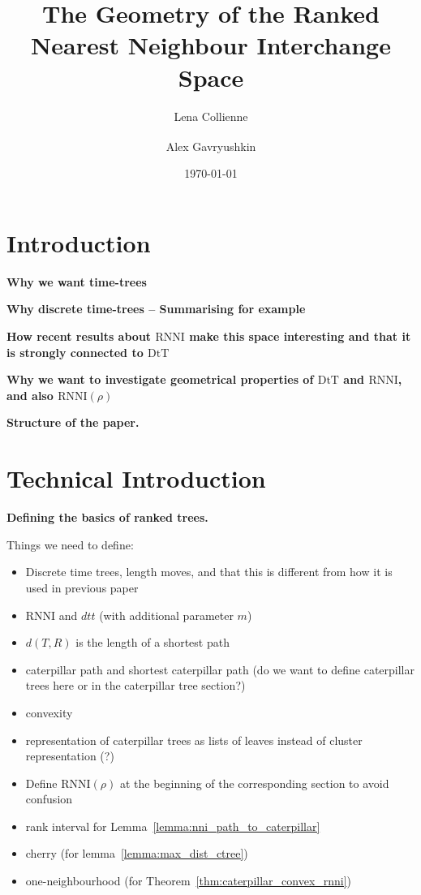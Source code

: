 \documentclass[11pt]{amsart}
\title[Geometry of ranked tree spaces]{The Geometry of the Ranked Nearest Neighbour Interchange Space}
\date{\today}
\author{Lena Collienne}
\author{Alex Gavryushkin\textsuperscript{\Letter}}
\newcommand{\rnni}{\mathrm{RNNI}}
\newcommand{\dtt}{\mathrm{DtT}}
\newcommand{\summary}[1]{\textbf{#1}} %
\begin{document}
\begin{abstract}
\end{abstract}

\maketitle


\section{Introduction}

\summary{Why we want time-trees}

\summary{Why discrete time-trees -- Summarising for example}

\summary{How recent results about $\rnni$ make this space interesting and that it is strongly connected to $\dtt$}

\summary{Why we want to investigate geometrical properties of $\dtt$ and $\rnni$, and also $\rnni(\rho)$}

\summary{Structure of the paper.}


\section{Technical Introduction}

\summary{Defining the basics of ranked trees.}

Things we need to define:
\begin{itemize}
	\item Discrete time trees, length moves, and that this is different from how it is used in previous paper
	\item $\rnni$ and $dtt$ (with additional parameter $m$)
	\item $d(T,R)$ is the length of a shortest path
	\item caterpillar path and shortest caterpillar path (do we want to define caterpillar trees here or in the caterpillar tree section?)
	\item convexity
	\item representation of caterpillar trees as lists of leaves instead of cluster representation (?)
	\item Define $\rnni(\rho)$ at the beginning of the corresponding section to avoid confusion
	\item rank interval for Lemma~\ref{lemma:nni_path_to_caterpillar}
	\item cherry (for lemma~\ref{lemma:max_dist_ctree})
	\item one-neighbourhood (for Theorem~\ref{thm:caterpillar_convex_rnni})
\end{itemize}
\end{document}
